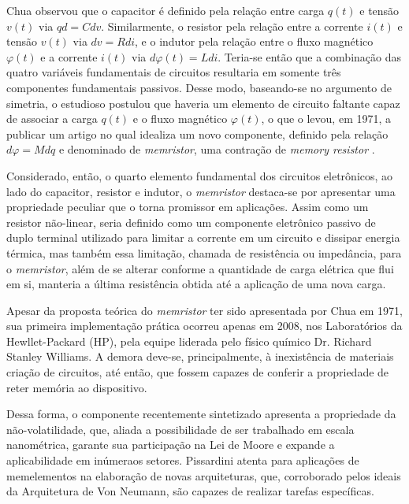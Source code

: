 \documentclass{ceel}
\begin{document}
\begin{multicols}{2}
Chua observou que o capacitor é definido pela relação entre carga $q(t)$ e tensão $v(t)$ via $qd=C dv$. Similarmente, o resistor pela relação entre a corrente $i(t)$ e tensão $v(t)$ via $dv=R di$, e o indutor pela relação entre o fluxo magnético $\varphi(t)$ e a corrente $i(t)$ via $d\varphi(t)=L di$. Teria-se então que a combinação das quatro variáveis fundamentais de circuitos resultaria em somente três componentes fundamentais passivos. Desse modo, baseando-se no argumento de simetria, o estudioso postulou que haveria um elemento de circuito faltante capaz de associar a carga $q(t)$ e o fluxo magnético $\varphi(t)$, o que o levou, em 1971, a publicar um artigo no qual idealiza um novo componente, definido pela relação $d\varphi=M dq$ e denominado de \emph{memristor}, uma contração de \emph{memory resistor} \cite{artigo}. 

Considerado, então, o quarto elemento fundamental dos circuitos eletrônicos, ao lado do capacitor, resistor e indutor, o \emph{memristor} destaca-se por apresentar uma propriedade peculiar que o torna promissor em aplicações. Assim como um resistor não-linear, seria definido como um componente eletrônico passivo de duplo terminal utilizado para limitar a corrente em um circuito e dissipar energia térmica, mas também essa limitação, chamada de resistência ou impedância, para o \emph{memristor}, além de se alterar conforme a quantidade de carga elétrica que flui em si, manteria a última resistência obtida até a aplicação de uma nova carga.

Apesar da proposta teórica do \emph{memristor} ter sido apresentada por Chua em 1971, sua primeira implementação prática ocorreu apenas em 2008, nos Laboratórios da Hewllet-Packard (HP), pela equipe liderada pelo físico químico Dr. Richard Stanley Williams. A demora deve-se, principalmente, à inexistência de materiais criação de circuitos, até então, que fossem capazes de conferir a propriedade de reter memória ao dispositivo.

Dessa forma, o componente recentemente sintetizado apresenta a propriedade da não-volatilidade, que, aliada a possibilidade de ser trabalhado em escala nanométrica, garante sua participação na Lei de Moore e expande a aplicabilidade em inúmeraos setores.
Pissardini \cite{memcomputacao} atenta para aplicações de memelementos na elaboração de novas arquiteturas, que, corroborado pelos ideais da Arquitetura de Von Neumann, são capazes de realizar tarefas específicas. 


\end{multicols}
\end{document}

